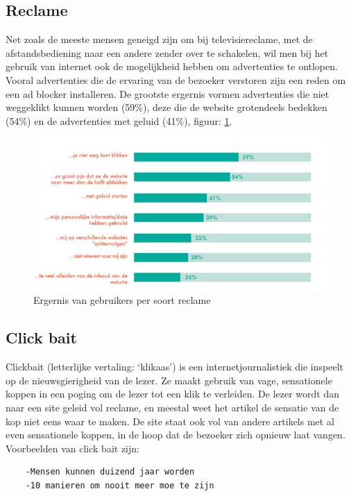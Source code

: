 \documentclass[pdftex,a4paper,12pt,twoside]{report}
\begin{document}
\subsection{Reclame}
\label{sec Reclame}
Net zoals de meeste mensen geneigd zijn om bij televisiereclame, met de afstandsbediening naar een andere zender over te schakelen, wil men bij het gebruik van internet ook de mogelijkheid hebben om advertenties te ontlopen. Vooral advertenties die de ervaring van de bezoeker verstoren zijn een reden om een ad blocker installeren. De grootste ergernis vormen advertenties die niet weggeklikt kunnen worden (59\%), deze die de website grotendeels bedekken (54\%) en de advertenties met geluid (41\%), figuur: \ref{fig: Redenadblockreclame}.
\begin{figure}[h!]
\centering
\includegraphics[width=12cm]{img/Redenadblockreclame}
\caption{Ergernis van gebruikers per soort reclame}
\label{fig: Redenadblockreclame}
\end{figure}

\subsection{Click bait}
\label{sec click bait}
Clickbait (letterlijke vertaling: ‘klikaas’) is een internetjournalistiek die inspeelt op de nieuwsgierigheid van de lezer. Ze maakt gebruik van vage, sensationele koppen in een poging om de lezer tot een klik te verleiden. De lezer wordt dan naar een site geleid vol reclame, en meestal weet het artikel de sensatie van de kop niet eens waar te maken. De site staat ook vol van andere artikels met al even sensationele koppen, in de hoop dat de bezoeker zich opnieuw laat vangen.
\\
Voorbeelden van click bait zijn:
\lstset{columns=flexible}
\begin{lstlisting}
	-Mensen kunnen duizend jaar worden
	-10 manieren om nooit meer moe te zijn
\end{lstlisting}
\end{document}
